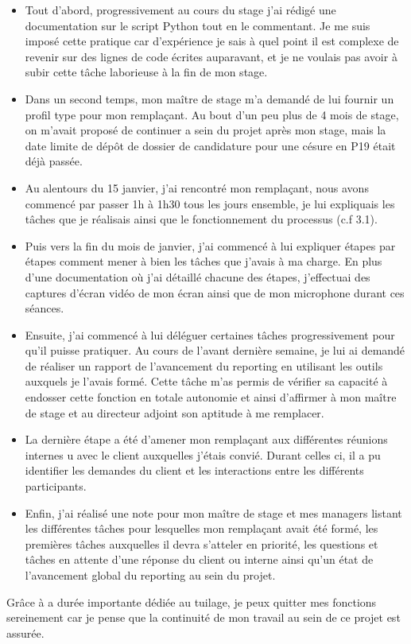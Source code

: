 \begin{itemize}
\item Tout d'abord, progressivement au cours du stage j'ai rédigé une documentation sur le script Python tout en le commentant. Je me suis imposé cette pratique car d'expérience je sais à quel point il est complexe de revenir sur des lignes de code écrites auparavant, et je ne voulais pas avoir à subir cette tâche laborieuse à la fin de mon stage.
\item Dans un second temps, mon maître de stage m'a demandé de lui fournir un profil type pour mon remplaçant. Au bout d'un peu plus de 4 mois de stage, on m'avait proposé de continuer a sein du projet après mon stage, mais la date limite de dépôt de dossier de candidature pour une césure en P19 était déjà passée.
\item Au alentours du 15 janvier, j'ai rencontré mon remplaçant, nous avons commencé par passer 1h à 1h30 tous les jours ensemble, je lui expliquais les tâches que je réalisais ainsi que le fonctionnement du processus (c.f 3.1).
\item Puis vers la fin du mois de janvier, j'ai commencé à lui expliquer étapes par étapes comment mener à bien les tâches que j'avais à ma charge. En plus d'une documentation où j'ai détaillé chacune des étapes, j'effectuai des captures d'écran vidéo de mon écran ainsi que de mon microphone durant ces séances.
\item Ensuite, j'ai commencé à lui déléguer certaines tâches progressivement pour qu'il puisse pratiquer. Au cours de l'avant dernière semaine, je lui ai demandé de réaliser un rapport de l'avancement du \gls{reporting} en utilisant les outils auxquels je l'avais formé. Cette tâche m'as permis de vérifier sa capacité à endosser cette fonction en totale autonomie et ainsi d'affirmer à mon maître de stage et au directeur adjoint son aptitude à me remplacer.
\item La dernière étape a été d'amener mon remplaçant aux différentes réunions internes u avec le client auxquelles j'étais convié. Durant celles ci, il a pu identifier les demandes du client et les interactions entre les différents participants.
\item Enfin, j'ai réalisé une note pour mon maître de stage et mes managers listant les différentes tâches pour lesquelles mon remplaçant avait été formé, les premières tâches auxquelles il devra s'atteler en priorité, les questions et tâches en attente d'une réponse du client ou interne ainsi qu'un état de l'avancement global du \gls{reporting} au sein du projet.
\end{itemize}

Grâce à a durée importante dédiée au tuilage, je peux quitter mes fonctions sereinement car je pense que la continuité de mon travail au sein de ce projet est assurée.




